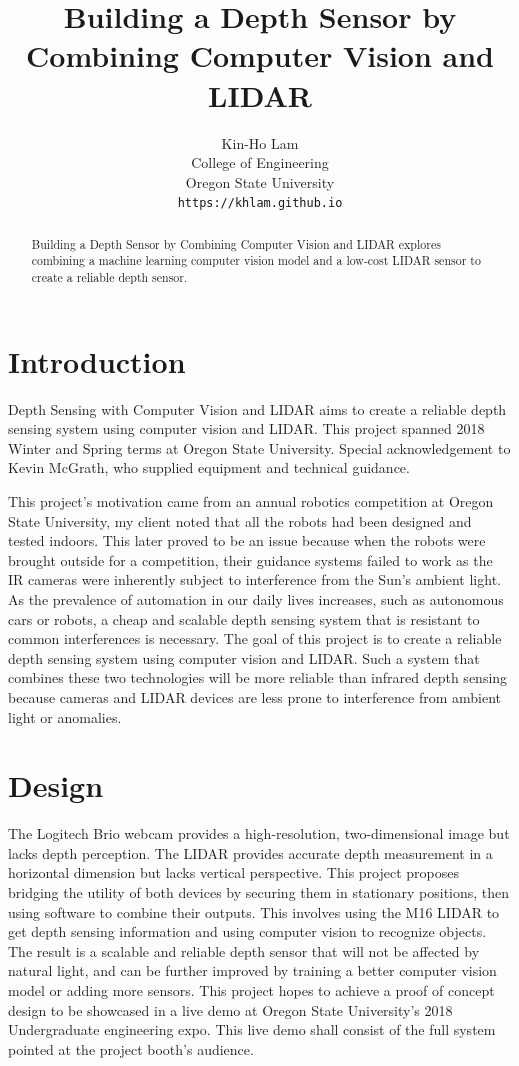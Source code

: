 \documentclass{article}
\title{Building a Depth Sensor by Combining Computer Vision and LIDAR}
\date{}
\author{
  Kin-Ho Lam\\
  College of Engineering\\
  Oregon State University \\
  \texttt{https://khlam.github.io}\\
}
\begin{document}
\maketitle

\begin{abstract}
  Building a Depth Sensor by Combining Computer Vision and LIDAR explores combining a machine learning computer vision model and a low-cost LIDAR sensor to create a reliable depth sensor.
\end{abstract}



\section{Introduction}
    Depth Sensing with Computer Vision and LIDAR aims to create a reliable depth sensing system using computer vision and LIDAR. 
		This project spanned 2018 Winter and Spring terms at Oregon State University.
		Special acknowledgement to Kevin McGrath, who supplied equipment and technical guidance.
		
		This project's motivation came from an annual robotics competition at Oregon State University, my client noted that all the robots had been designed and tested indoors.
		This later proved to be an issue because when the robots were brought outside for a competition, their guidance systems failed to work as the IR cameras were inherently subject to interference from the Sun's ambient light.
		As the prevalence of automation in our daily lives increases, such as autonomous cars or robots, a cheap and scalable depth sensing system that is resistant to common interferences is necessary.
		The goal of this project is to create a reliable depth sensing system using computer vision and LIDAR.
		Such a system that combines these two technologies will be more reliable than infrared depth sensing because cameras and LIDAR devices are less prone to interference from ambient light or anomalies.

\section{Design}
\label{sec:Design}
    The Logitech Brio webcam provides a high-resolution, two-dimensional image but lacks depth perception.
		The LIDAR provides accurate depth measurement in a horizontal dimension but lacks vertical perspective.
		This project proposes bridging the utility of both devices by securing them in stationary positions, then using software to combine their outputs.
		This involves using the M16 LIDAR to get depth sensing information and using computer vision to recognize objects.
		The result is a scalable and reliable depth sensor that will not be affected by natural light, and can be further improved by training a better computer vision model or adding more sensors.
		This project hopes to achieve a proof of concept design to be showcased in a live demo at Oregon State University's 2018 Undergraduate engineering expo.			
		This live demo shall consist of the full system pointed at the project booth's audience. 
\end{document}
